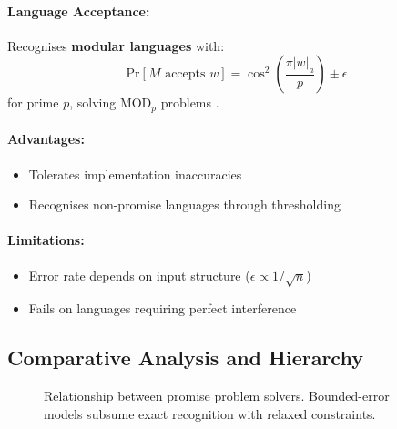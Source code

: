 \paragraph{Language Acceptance:}
Recognises \textbf{modular languages} with:
\[
\text{Pr}[M \text{ accepts } w] = \cos^2\left(\frac{\pi |w|_a}{p}\right) \pm \epsilon
\]
for prime $p$, solving MOD$_p$ problems \cite{ambainis2002quantum}.

\paragraph{Advantages:}
\begin{itemize}
    \item Tolerates implementation inaccuracies
    \item Recognises non-promise languages through thresholding
\end{itemize}

\paragraph{Limitations:}
\begin{itemize}
    \item Error rate depends on input structure ($\epsilon \propto 1/\sqrt{n}$)
    \item Fails on languages requiring perfect interference
\end{itemize}

\subsection*{Comparative Analysis and Hierarchy}
\begin{figure}[h]
\centering
{}
\caption{Relationship between promise problem solvers. Bounded-error models subsume exact recognition with relaxed constraints.}
\label{fig:promise-hierarchy}
\end{figure}

